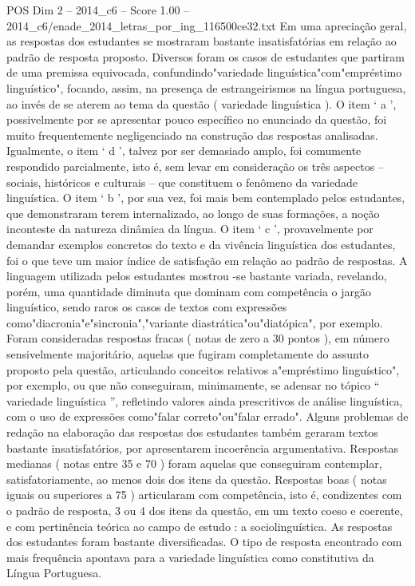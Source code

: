\begin{textsample}{POS Dim 2 – 2014\_c6 – Score 1.00 – 2014\_c6/enade\_2014\_letras\_por\_ing\_116500ce32.txt}
Em uma apreciação geral, as respostas dos estudantes se mostraram bastante insatisfatórias em relação ao padrão de resposta proposto.
Diversos foram os casos de estudantes que partiram de uma premissa equivocada, confundindo"variedade linguística"com"empréstimo linguístico", focando, assim, na presença de estrangeirismos na língua portuguesa, ao invés de se aterem ao tema da questão ( variedade linguística ).
O item ‘ a ’, possivelmente por se apresentar pouco específico no enunciado da questão, foi muito frequentemente negligenciado na construção das respostas analisadas.
Igualmente, o item ‘ d ’, talvez por ser demasiado amplo, foi comumente respondido parcialmente, isto é, sem levar em consideração os três aspectos – sociais, históricos e culturais – que constituem o fenômeno da variedade linguística.
O item ‘ b ’, por sua vez, foi mais bem contemplado pelos estudantes, que demonstraram terem internalizado, ao longo de suas formações, a noção inconteste da natureza dinâmica da língua.
O item ‘ c ’, provavelmente por demandar exemplos concretos do texto e da vivência linguística dos estudantes, foi o que teve um maior índice de satisfação em relação ao padrão de respostas.
A linguagem utilizada pelos estudantes mostrou -se bastante variada, revelando, porém, uma quantidade diminuta que dominam com competência o jargão linguístico, sendo raros os casos de textos com expressões como"diacronia"e"sincronia","variante diastrática"ou"diatópica", por exemplo.
Foram consideradas respostas fracas ( notas de zero a 30 pontos ), em número sensivelmente majoritário, aquelas que fugiram completamente do assunto proposto pela questão, articulando conceitos relativos a"empréstimo linguístico", por exemplo, ou que não conseguiram, minimamente, se adensar no tópico “ variedade linguística ”, refletindo valores ainda prescritivos de análise linguística, com o uso de expressões como"falar correto"ou"falar errado".
Alguns problemas de redação na elaboração das respostas dos estudantes também geraram textos bastante insatisfatórios, por apresentarem incoerência argumentativa.
Respostas medianas ( notas entre 35 e 70 ) foram aquelas que conseguiram contemplar, satisfatoriamente, ao menos dois dos itens da questão.
Respostas boas ( notas iguais ou superiores a 75 ) articularam com competência, isto é, condizentes com o padrão de resposta, 3 ou 4 dos itens da questão, em um texto coeso e coerente, e com pertinência teórica ao campo de estudo : a sociolinguística.
As respostas dos estudantes foram bastante diversificadas.
O tipo de resposta encontrado com mais frequência apontava para a variedade linguística como constitutiva da Língua Portuguesa.

\end{textsample}
